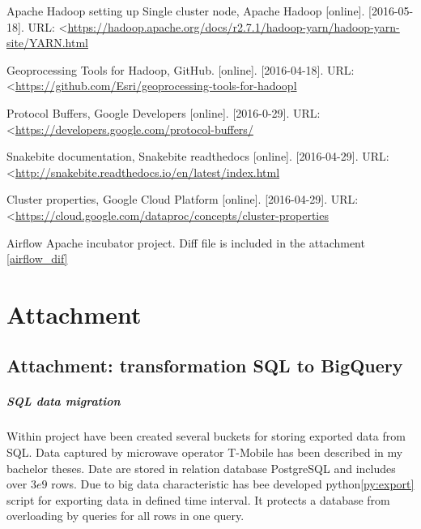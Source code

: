 \documentclass[a4paper,12pt,oneside]{report}
\renewcommand*\thesection{\arabic{section}}
\begin{document}
\begin{thebibliography}{99}
		Apache Hadoop setting up Single cluster node, Apache Hadoop [online].
		[2016-05-18]. 
		URL:
		\textless\url{https://hadoop.apache.org/docs/r2.7.1/hadoop-yarn/hadoop-yarn-site/YARN.html}
		
		
		Geoprocessing Tools for Hadoop, GitHub. [online]. [2016-04-18]. 
		URL: \textless\url{https://github.com/Esri/geoprocessing-tools-for-hadoopl}
		
		Protocol Buffers, Google Developers [online]. [2016-0-29]. 
		URL: \textless\url{https://developers.google.com/protocol-buffers/}
		
		Snakebite documentation, Snakebite readthedocs [online]. [2016-04-29]. 
		URL: \textless\url{http://snakebite.readthedocs.io/en/latest/index.html}
		
		Cluster properties, Google Cloud Platform [online]. [2016-04-29]. 
		URL:
		\textless\url{https://cloud.google.com/dataproc/concepts/cluster-properties}
		
		
		Airflow Apache incubator project. Diff file is included in the attachment
		\ref{airflow_dif}
		
		
		
		
	\end{thebibliography}
	
	

	
	\setcounter{footnote}{1}
	\newpage
	
	\appendix
	
	\renewcommand\thesection{\Alph{section}}
	\chapter*{Attachment}
\section{Attachment: transformation SQL to BigQuery}
		\paragraph{SQL data migration} Within project have been created several buckets
		for storing exported data from SQL. Data captured by microwave operator T-Mobile has been 
		described	in my bachelor theses\cite{bp_krejci}. 	Date are stored in relation database 
		PostgreSQL and includes over $3e9$ rows. Due to big data characteristic has bee	developed python\ref{py:export} %
		script for exporting data in defined time interval. It protects a database from overloading by queries for all rows in one	query. 
		
\end{document}
